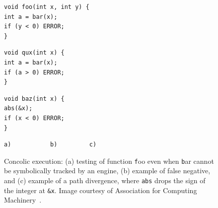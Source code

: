 \begin{figure}[t]
	\vspace{-2.5mm}
	\begin{minipage}{.30\textwidth}
		\begin{lstlisting}[basicstyle=\ttfamily\scriptsize]
void foo(int x, int y) {
int a = bar(x);
if (y < 0) ERROR;
} 
		\end{lstlisting}
		\vspace{-4mm}
	\end{minipage}%
	\hspace{5mm}
	\begin{minipage}{.30\textwidth}
		\begin{lstlisting}[basicstyle=\ttfamily\scriptsize]
void qux(int x) {
int a = bar(x);
if (a > 0) ERROR;
} 
		\end{lstlisting}
		\vspace{-4mm}
	\end{minipage}%
	\hspace{5mm}
	\begin{minipage}{.30\textwidth}
		\begin{lstlisting}[basicstyle=\ttfamily\scriptsize]
void baz(int x) {
abs(&x);
if (x < 0) ERROR;
}   
		\end{lstlisting}
		\vspace{-4mm}
	\end{minipage}%
\begin{Verbatim}[obeytabs]
	a)		     b)			c)
\end{Verbatim}
	\vspace{+2pt}
	\caption{Concolic execution: (a) testing of function {\texttt foo} even when {\texttt bar} cannot be symbolically tracked by an engine, (b) example of false negative, and (c) example of a path divergence, where \texttt{abs} drops the sign of the integer at \texttt{\&x}. 
		Image courtesy of Association for Computing Machinery~\cite{Baldoni:2018:SSE:3212709.3182657}.
	}
	\label{fig:example-concolic-problems}
	\vspace{-3mm}
\end{figure}




